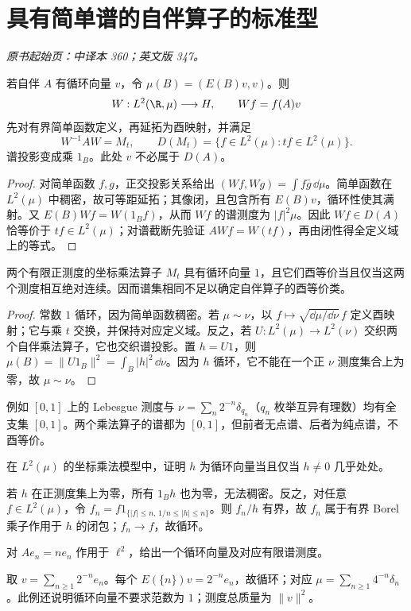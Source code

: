 \section{具有简单谱的自伴算子的标准型}\label{sec:yosida-11-14}
\noindent\textit{原书起始页：中译本 360；英文版 347。}

\begin{theorem}[循环谱的乘法模型]\label{thm:y11-cyclic-model}
若自伴 $A$ 有循环向量 $v$，令 $\mu(B)=(E(B)v,v)$。则
\[
 W:L^2(\R,\mu)\longrightarrow H,\qquad Wf=f(A)v
\]
先对有界简单函数定义，再延拓为酉映射，并满足
\[
 W^{-1}AW=M_t,\qquad
 D(M_t)=\{f\in L^2(\mu):tf\in L^2(\mu)\}.
\]
谱投影变成乘 $1_B$。此处 $v$ 不必属于 $D(A)$。
\end{theorem}
\begin{proof}
对简单函数 $f,g$，正交投影关系给出 $(Wf,Wg)=\int f\bar g\,\dd\mu$。简单函数在 $L^2(\mu)$ 中稠密，故可等距延拓；其像闭，且包含所有 $E(B)v$，循环性使其满射。又 $E(B)Wf=W(1_Bf)$，从而 $Wf$ 的谱测度为 $|f|^2\mu$。因此 $Wf\in D(A)$ 恰等价于 $tf\in L^2(\mu)$；对谱截断先验证 $AWf=W(tf)$，再由闭性得全定义域上的等式。
\end{proof}

\begin{proposition}[简单谱的酉不变量]\label{prop:y11-measure-class}
两个有限正测度的坐标乘法算子 $M_t$ 具有循环向量 $1$，且它们酉等价当且仅当这两个测度相互绝对连续。因而谱集相同不足以确定自伴算子的酉等价类。
\end{proposition}
\begin{proof}
常数 $1$ 循环，因为简单函数稠密。若 $\mu\sim\nu$，以 $f\mapsto\sqrt{\dd\mu/\dd\nu}\,f$ 定义酉映射；它与乘 $t$ 交换，并保持对应定义域。反之，若 $U:L^2(\mu)\to L^2(\nu)$ 交织两个自伴乘法算子，它也交织谱投影。置 $h=U1$，则 $\mu(B)=\|U1_B\|^2=\int_B|h|^2\,\dd\nu$。因为 $h$ 循环，它不能在一个正 $\nu$ 测度集合上为零，故 $\mu\sim\nu$。
\end{proof}

例如 $[0,1]$ 上的 Lebesgue 测度与 $\nu=\sum_n2^{-n}\delta_{q_n}$（$q_n$ 枚举互异有理数）均有全支集 $[0,1]$。两个乘法算子的谱都为 $[0,1]$，但前者无点谱、后者为纯点谱，不酉等价。

\begin{exercise}[换循环向量]\label{ex:y11-change-cyclic}
在 $L^2(\mu)$ 的坐标乘法模型中，证明 $h$ 为循环向量当且仅当 $h\ne0$ 几乎处处。
\end{exercise}
\begin{solution}
若 $h$ 在正测度集上为零，所有 $1_Bh$ 也为零，无法稠密。反之，对任意 $f\in L^2(\mu)$，令 $f_n=f1_{\{|f|\le n,\,1/n\le|h|\le n\}}$。则 $f_n/h$ 有界，故 $f_n$ 属于有界 Borel 乘子作用于 $h$ 的闭包；$f_n\to f$，故循环。
\end{solution}

\begin{exercise}[离散简单谱]\label{ex:y11-discrete-cyclic}
对 $Ae_n=ne_n$ 作用于 $\ell^2$，给出一个循环向量及对应有限谱测度。
\end{exercise}
\begin{solution}
取 $v=\sum_{n\ge1}2^{-n}e_n$。每个 $E(\{n\})v=2^{-n}e_n$，故循环；对应 $\mu=\sum_{n\ge1}4^{-n}\delta_n$。此例还说明循环向量不要求范数为 $1$；测度总质量为 $\|v\|^2$。
\end{solution}
